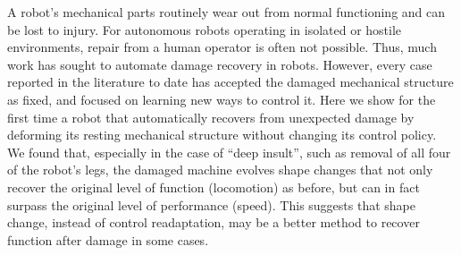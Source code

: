 % 
\noindent
A robot's mechanical parts routinely wear out from normal functioning and can be lost to injury. For autonomous robots operating in isolated or hostile environments, repair from a human operator is often not possible.
Thus, much work has sought to automate damage recovery in robots.
However, every case reported in the literature to date has accepted the damaged mechanical structure as fixed, and focused on learning new ways to control it.
Here we show for the first time a robot that automatically recovers from unexpected damage by deforming its resting mechanical structure without changing its control policy.
We found that, especially in the case of ``deep insult'', such as removal of all four of the robot's legs, the damaged machine evolves shape changes that not only recover the original level of function (locomotion) as before, but can in fact surpass the original level of performance (speed).
This suggests that shape change, instead of control readaptation, may be a better method to recover function after damage in some cases.
%
